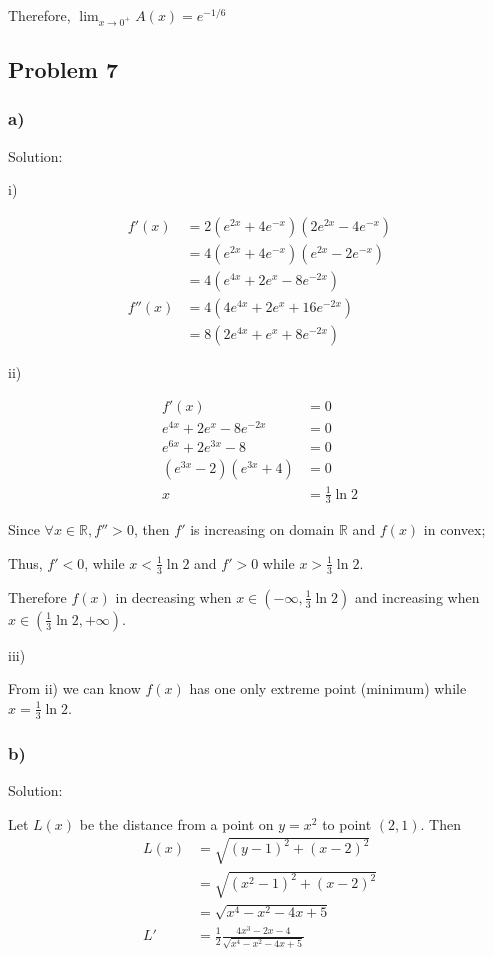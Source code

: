 \documentclass[letterpaper, 11pt]{article}
\newcommand{\1}{\mathds{1}}	%
\theoremstyle{definition}
\begin{document}
Therefore, $\lim_{x \to 0 ^{+}} A(x) = e ^{-1/6}$

\subsection*{Problem 7}

\subsubsection*{a)}

Solution:

i)

\begin{align*}
  f'(x) &= 2(e ^{2x} + 4e ^{-x})(2e ^{2x} -4e ^{-x}) \\
  &= 4(e ^{2x} + 4e ^{-x})(e ^{2x} - 2e ^{-x}) \\
  &= 4 (e ^{4x} + 2e ^{x} - 8e ^{-2x}) \\
  f''(x) &= 4(4e ^{4x} + 2e ^{x} + 16e ^{-2x}) \\
        &= 8(2e ^{4x} + e ^{x} + 8e ^{-2x})
\end{align*}

ii)

\begin{align*}
  f'(x) & = 0 \\
  e ^{4x} + 2e ^{x} - 8e ^{-2x} &= 0 \\
  e ^{6x} + 2e ^{3x} - 8 &=0 \\
  (e ^{3x} - 2)(e ^{3x} + 4) &= 0 \\
  x &= \frac{1}{3}\ln2
\end{align*}

Since $\forall x \in \mathbb{R}, f'' > 0$, then $f'$ is increasing on domain $\mathbb{R}$ and $f(x)$ in convex;

Thus, $f' < 0$, while $x < \frac{1}{3}\ln2$ and $f' > 0$ while $ x > \frac{1}{3}\ln2$.

Therefore $f(x)$ in decreasing when $x \in (-\infty, \frac{1}{3}\ln2)$ and increasing when $x \in (\frac{1}{3}\ln2, +\infty)$.

iii)

From ii) we can know $f(x)$ has one only extreme point (minimum) while $x = \frac{1}{3}\ln2$.


\subsubsection*{b)}

Solution:

Let $L(x)$ be the distance from a point on $y=x ^{2}$ to point $(2,1)$. Then 
\begin{align*}
  L(x) &= \sqrt{(y - 1) ^{2} + (x-2) ^{2}} \\
       &= \sqrt{(x ^{2} - 1) ^{2} + (x-2) ^{2}} \\
       &= \sqrt{x ^{4} - x ^{2} -4x + 5} \\
  L' &= \frac{1}{2}\frac{4x ^{3} -2x -4}{\sqrt{x ^{4} - x ^{2} -4x + 5}}
\end{align*}
\end{document}
